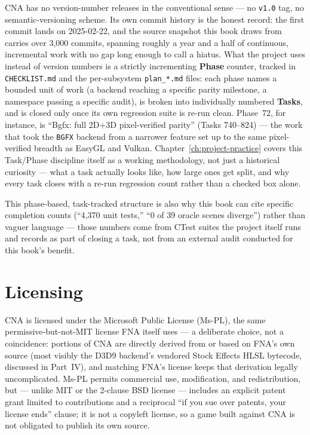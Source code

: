 CNA has no version-number releases in the conventional sense --- no \texttt{v1.0} tag, no
semantic-versioning scheme. Its own commit history is the honest record: the first commit lands
on 2025-02-22, and the source snapshot this book draws from carries over 3{,}000 commits,
spanning roughly a year and a half of continuous, incremental work with no gap long enough to
call a hiatus. What the project uses instead of version numbers is a strictly incrementing
\textbf{Phase} counter, tracked in \texttt{CHECKLIST.md} and the per-subsystem \texttt{plan\_*.md}
files: each phase names a bounded unit of work (a backend reaching a specific parity milestone,
a namespace passing a specific audit), is broken into individually numbered \textbf{Tasks}, and
is closed only once its own regression suite is re-run clean. Phase~72, for instance, is ``Bgfx:
full 2D+3D pixel-verified parity'' (Tasks 740--824) --- the work that took the \texttt{BGFX}
backend from a narrower feature set up to the same pixel-verified breadth as EasyGL and Vulkan.
Chapter~\ref{ch:project-practice} covers this Task/Phase discipline itself as a working
methodology, not just a historical curiosity --- what a task actually looks like, how large ones
get split, and why every task closes with a re-run regression count rather than a checked box
alone.

This phase-based, task-tracked structure is also why this book can cite specific completion
counts (``4{,}370 unit tests,'' ``0 of 39 oracle scenes diverge'') rather than vaguer language ---
those numbers come from CTest suites the project itself runs and records as part of closing a
task, not from an external audit conducted for this book's benefit.

\section{Licensing}

CNA is licensed under the Microsoft Public License (Ms-PL), the same permissive-but-not-MIT
license FNA itself uses --- a deliberate choice, not a coincidence: portions of CNA are
directly derived from or based on FNA's own source (most visibly the D3D9 backend's vendored
Stock Effects HLSL bytecode, discussed in Part~IV), and matching FNA's license keeps that
derivation legally uncomplicated. Ms-PL permits commercial use, modification, and
redistribution, but --- unlike MIT or the 2-clause BSD license --- includes an explicit patent
grant limited to contributions and a reciprocal ``if you sue over patents, your license ends''
clause; it is not a copyleft license, so a game built against CNA is not obligated to publish its
own source.

